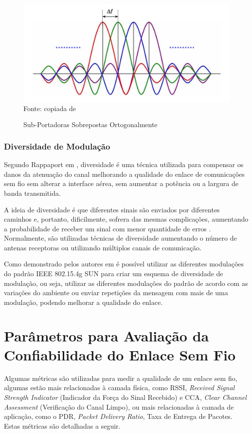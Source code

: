 \begin{figure}[ht]
	\begin{center}
		\caption{Sub-Portadoras Sobrepostas Ortogonalmente}
		\includegraphics[width=12cm]{./sections/textual/chapters/images/ofdm.jpg}\\
		Fonte: copiada de \cite{figOFDM}
		\label{fig:ofdm}
	\end{center}
\end{figure}

\subsubsection{Diversidade de Modulação}
Segundo Rappaport em \cite{rappaport2009}, diversidade é uma técnica utilizada para compensar os danos da atenuação do canal melhorando a qualidade do enlace de comunicações sem fio sem alterar a interface aérea, sem aumentar a potência ou a largura de banda transmitida.

A ideia de diversidade é que diferentes sinais são enviados por diferentes caminhos e, portanto, dificilmente, sofrera das mesmas complicações, aumentando a probabilidade de receber um sinal com menor quantidade de erros \cite{goldsmith2005wireless}. Normalmente, são utilizadas técnicas de diversidade aumentando o número de antenas receptoras ou utilizando múltiplos canais de comunicação.

Como demonstrado pelos autores em \cite{gomes2020improving} é possível utilizar as diferentes modulações do padrão IEEE 802.15.4g SUN para criar um esquema de diversidade de modulação, ou seja, utilizar as diferentes modulações do padrão de acordo com as variações do ambiente ou enviar repetições da mensagem com mais de uma modulação, podendo melhorar a qualidade do enlace.

\section{Parâmetros para Avaliação da Confiabilidade do Enlace Sem Fio}
\label{paramSF}
Algumas métricas são utilizadas para medir a qualidade de um enlace sem fio, algumas estão mais relacionadas à camada física, como RSSI, \emph{Received Signal Strength Indicator} (Indicador da Força do Sinal Recebido) e CCA, \emph{Clear Channel Assessment} (Verificação do Canal Limpo), ou mais relacionadas à camada de aplicação, como o PDR, \emph{Packet Delivery Ratio}, Taxa de Entrega de Pacotes. Estas métricas são detalhadas a seguir.

